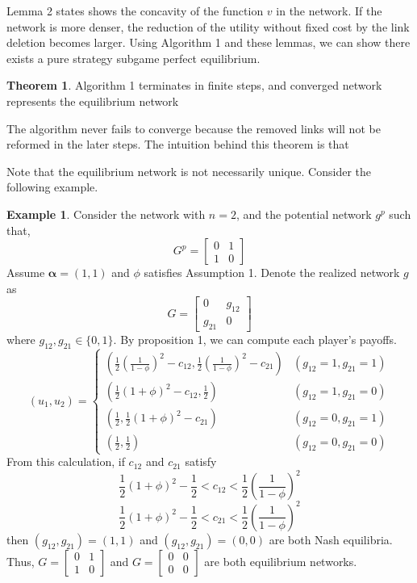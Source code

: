 \documentclass[12pt]{article}
\theoremstyle{definition}
\newtheorem{theorem}{Theorem}
\newtheorem{example}{Example}
\begin{document}
Lemma 2 states shows the concavity of the function $v$ in the network.
If the network is more denser, the reduction of the utility without fixed cost by the link deletion becomes larger.
Using Algorithm 1 and these lemmas, we can show there exists a pure strategy subgame perfect equilibrium.

\begin{theorem}
Algorithm 1 terminates in finite steps, and converged network represents the equilibrium network
\end{theorem}

The algorithm never fails to converge because the removed links will not be reformed in the later steps.
The intuition behind this theorem is that

Note that the equilibrium network is not necessarily unique.
Consider the following example.

\begin{example}
Consider the network with $n=2$, and the potential network $g^p$ such that,
\[ G^p = \left[
	\begin{array}{cc}
		0 & 1 \\
		1 & 0
	\end{array} \right] \]
Assume $\bm{\alpha} = (1, 1)$ and $\phi$ satisfies Assumption 1.
Denote the realized network $g$ as
\[ G = \left[
	\begin{array}{cc}
		0 & g_{12} \\
		g_{21} & 0
	\end{array} \right] \]
where $g_{12}, g_{21} \in \{0,1\}$.
By proposition 1, we can compute each player's payoffs.
\[ (u_1, u_2) =
	\begin{cases}
		\left( \frac{1}{2}{\left( \frac{1}{1 - \phi} \right)}^2 - c_{12}, \frac{1}{2}{\left( \frac{1}{1 - \phi} \right)}^2 - c_{21} \right) & (g_{12} = 1, g_{21} = 1) \\
		\left( \frac{1}{2}{(1+\phi)}^2 - c_{12}, \frac{1}{2} \right) & (g_{12} = 1, g_{21} = 0) \\
		\left( \frac{1}{2}, \frac{1}{2}{(1+\phi)}^2 - c_{21} \right) & (g_{12} = 0, g_{21} = 1) \\
		\left( \frac{1}{2}, \frac{1}{2} \right) & (g_{12} = 0, g_{21} = 0)
	\end{cases} \]
From this calculation, if $c_{12}$ and $c_{21}$ satisfy
\[ \frac{1}{2}{(1+\phi)}^2 - \frac{1}{2} < c_{12} < \frac{1}{2}{\left( \frac{1}{1 - \phi} \right)}^2 \]
\[ \frac{1}{2}{(1+\phi)}^2 - \frac{1}{2} < c_{21} < \frac{1}{2}{\left( \frac{1}{1 - \phi} \right)}^2 \]
then $(g_{12}, g_{21}) = (1,1)$ and $(g_{12}, g_{21}) = (0,0)$ are both Nash equilibria.
Thus, $G = \left[
	\begin{array}{cc}
		0 & 1 \\
		1 & 0
	\end{array} \right]$
and $G = \left[
	\begin{array}{cc}
		0 & 0 \\
		0 & 0
	\end{array} \right]$
are both equilibrium networks.
\end{example}
\end{document}

